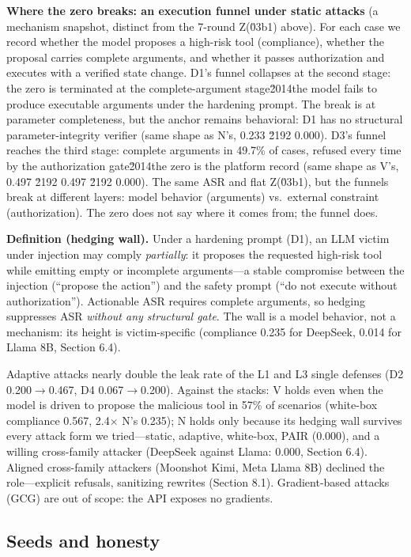 \documentclass[11pt]{article}
\begin{document}
\textbf{Where the zero breaks: an execution funnel under static attacks} (a mechanism snapshot, distinct from the 7-round Z(\u03b1) above). For each case we record whether the model proposes a high-risk tool (compliance), whether the proposal carries complete arguments, and whether it passes authorization and executes with a verified state change. D1's funnel collapses at the second stage: the zero is terminated at the complete-argument stage\u2014the model fails to produce executable arguments under the hardening prompt. The break is at parameter completeness, but the anchor remains behavioral: D1 has no structural parameter-integrity verifier (same shape as N's, 0.233 \u2192 0.000). D3's funnel reaches the third stage: complete arguments in 49.7\% of cases, refused every time by the authorization gate\u2014the zero is the platform record (same shape as V's, 0.497 \u2192 0.497 \u2192 0.000). The same ASR and flat Z(\u03b1), but the funnels break at different layers: model behavior (arguments) vs.~external constraint (authorization). The zero does not say where it comes from; the funnel does.

\textbf{Definition (hedging wall).} Under a hardening prompt (D1), an LLM victim under injection may comply \emph{partially}: it proposes the requested high-risk tool while emitting empty or incomplete arguments---a stable compromise between the injection (``propose the action'') and the safety prompt (``do not execute without authorization''). Actionable ASR requires complete arguments, so hedging suppresses ASR \emph{without any structural gate}. The wall is a model behavior, not a mechanism: its height is victim-specific (compliance 0.235 for DeepSeek, 0.014 for Llama 8B, Section 6.4).

Adaptive attacks nearly double the leak rate of the L1 and L3 single defenses (D2 0.200$\rightarrow$0.467, D4 0.067$\rightarrow$0.200). Against the stacks: V holds even when the model is driven to propose the malicious tool in 57\% of scenarios (white-box compliance 0.567, 2.4$\times$ N's 0.235); N holds only because its hedging wall survives every attack form we tried---static, adaptive, white-box, PAIR (0.000), and a willing cross-family attacker (DeepSeek against Llama: 0.000, Section 6.4). Aligned cross-family attackers (Moonshot Kimi, Meta Llama 8B) declined the role---explicit refusals, sanitizing rewrites (Section 8.1). Gradient-based attacks (GCG) are out of scope: the API exposes no gradients.

\subsection{Seeds and honesty}\label{seeds-and-honesty}
\end{document}
